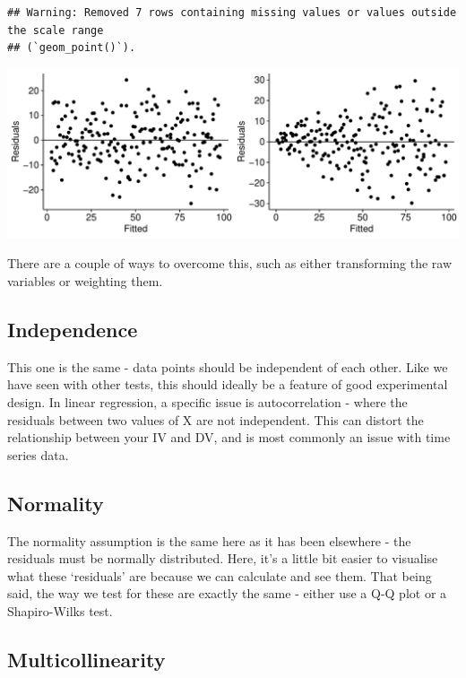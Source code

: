 \documentclass[
]{book}
\begin{document}
\begin{verbatim}
## Warning: Removed 7 rows containing missing values or values outside the scale range
## (`geom_point()`).
\end{verbatim}

\begin{center}\includegraphics{_main_files/figure-latex/unnamed-chunk-192-1} \end{center}

There are a couple of ways to overcome this, such as either transforming the raw variables or weighting them.

\hypertarget{independence}{%
\subsection{Independence}\label{independence}}

This one is the same - data points should be independent of each other. Like we have seen with other tests, this should ideally be a feature of good experimental design. In linear regression, a specific issue is autocorrelation - where the residuals between two values of X are not independent. This can distort the relationship between your IV and DV, and is most commonly an issue with time series data.

\hypertarget{normality}{%
\subsection{Normality}\label{normality}}

The normality assumption is the same here as it has been elsewhere - the residuals must be normally distributed. Here, it's a little bit easier to visualise what these `residuals' are because we can calculate and see them. That being said, the way we test for these are exactly the same - either use a Q-Q plot or a Shapiro-Wilks test.

\hypertarget{multicollinearity}{%
\subsection{Multicollinearity}\label{multicollinearity}}
\end{document}
